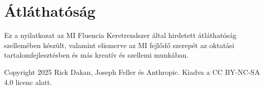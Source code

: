\documentclass[a4paper, 11pt]{article}
\begin{document}
\section*{Átláthatóság}
Ez a nyilatkozat az MI Fluencia Keretrendszer által hirdetett átláthatóság szellemében készült, valamint elismerve az MI fejlődő szerepét az oktatási tartalomfejlesztésben és más kreatív és szellemi munkában.

\vspace{\fill}
\begin{center}
    \small{Copyright 2025 Rick Dakan, Joseph Feller és Anthropic. Kiadva a CC BY-NC-SA 4.0 licenc alatt.}
\end{center}
\end{document}
